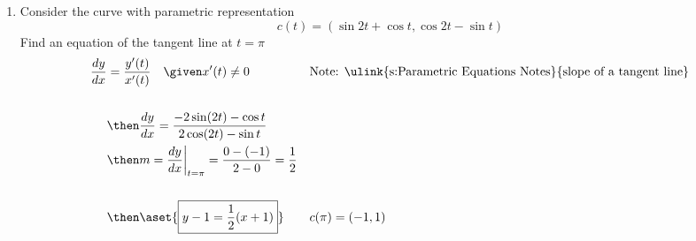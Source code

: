 \begin{enumerate}
\newpage %

  \item Consider the curve with parametric representation \[c(t) = (\sin 2t +
    \cos t, \cos 2t - \sin t)\]
    Find an equation of the tangent line at \(t=\pi\)
    \begin{align*}
      \frac{dy}{dx} &= \frac{y'(t)}{x'(t)} \quad \given x'(t) \neq 0
     &&\text{Note: \ulink{s:Parametric Equations Notes}{slope of a tangent line}} \\
     \\
     &\then \frac{dy}{dx} = \frac{-2\sin(2t) - \cos t}{2\cos(2t) - \sin t} \\
     &\then m = \frac{dy}{dx} \bigg|_{t=\pi} = \frac{0 - (-1)}{2 - 0} = \frac{1}{2}\\
     \\
     &\then \aset{\boxed{y - 1 = \frac{1}{2}(x+1)}}
      && c(\pi) = (-1, 1)\\
    \end{align*}
\end{enumerate}
